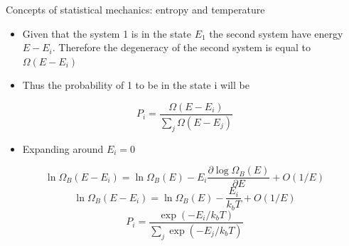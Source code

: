 \documentclass{beamer}
\begin{document}
\begin{frame}{Concepts of statistical mechanics: entropy and temperature \cite{frenkel2001understanding}}
\begin{itemize}
\item Given that the system 1 is in the state $E_{1}$ the second system have energy $E-E_{i}$. Therefore the degeneracy of the second system is equal to $\Omega(E-E_{i})$
\item Thus the probability of 1 to be in the state i will be 
\end{itemize}

\begin{equation*}
P_{i}=\dfrac{\Omega(E-E_{i})}{\sum_{j}\Omega(E-E_{j})}
\end{equation*}
\begin{itemize}

\item Expanding around $E_{i}=0$
\end{itemize}
\begin{equation*}
\ln\Omega_{B}(E-E_{i})=\ln\Omega_{B}(E)-E_{i}\frac{\partial\log\Omega_{B}(E)}{\partial E}+O(1/E)
\end{equation*}
\begin{equation*}
\ln\Omega_{B}(E-E_{i})=\ln\Omega_{B}(E)-\dfrac{E_{i}}{k_{b}T}+O(1/E)
\end{equation*}
\begin{equation*}
P_{i}=\dfrac{\exp(-E_{i}/k_{b}T)}{\sum_{j}\exp(-E_{j}/k_{b}T)}
\end{equation*}


\end{frame}
\end{document}

